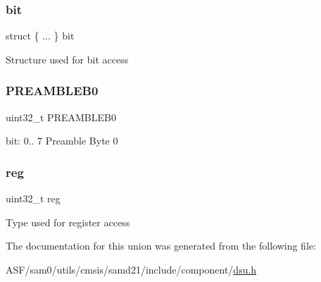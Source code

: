 \subsubsection{\texorpdfstring{bit}{bit}}
{\footnotesize\ttfamily struct \{ ... \}   bit}

Structure used for bit access \mbox{\label{union_d_s_u___c_i_d0___type_aa8dbe5bb6810d255b60e74eb37ea6e07}} 
\subsubsection{\texorpdfstring{PREAMBLEB0}{PREAMBLEB0}}
{\footnotesize\ttfamily uint32\+\_\+t P\+R\+E\+A\+M\+B\+L\+E\+B0}

bit\+: 0.. 7 Preamble Byte 0 \mbox{\label{union_d_s_u___c_i_d0___type_a6b91636401516a477989a336376d7b40}} 
\subsubsection{\texorpdfstring{reg}{reg}}
{\footnotesize\ttfamily uint32\+\_\+t reg}

Type used for register access 

The documentation for this union was generated from the following file\+:\begin{DoxyCompactItemize}
\item 
A\+S\+F/sam0/utils/cmsis/samd21/include/component/\mbox{\hyperlink{component_2dsu_8h}{dsu.\+h}}\end{DoxyCompactItemize}
